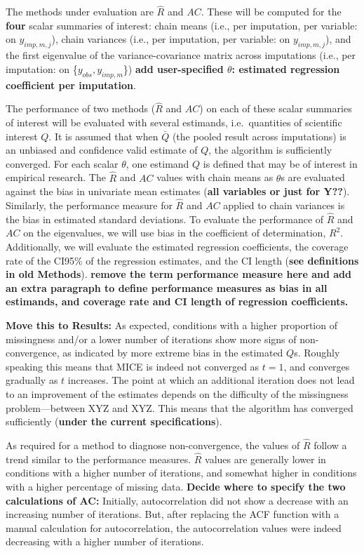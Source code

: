 \documentclass[Royal,times,sageh]{sagej}
\begin{document}
The methods under evaluation are \(\widehat{R}\) and \(AC\). These will
be computed for the \textbf{four} scalar summaries of interest: chain
means (i.e., per imputation, per variable: on \(y_{imp, m, j}\)), chain
variances (i.e., per imputation, per variable: on \(y_{imp, m, j}\)),
and the first eigenvalue of the variance-covariance matrix across
imputations (i.e., per imputation: on \{\(y_{obs}, y_{imp, m}\)\})
\textbf{add user-specified \(\theta\): estimated regression coefficient
per imputation}.

The performance of two methods (\(\widehat{R}\) and \(AC\)) on each of
these scalar summaries of interest will be evaluated with several
estimands, i.e.~quantities of scientific interest \(Q\). It is assumed
that when \(\bar{Q}\) (the pooled result across imputations) is an
unbiased and confidence valid estimate of \(Q\), the algorithm is
sufficiently converged. For each scalar \(\theta\), one estimand \(Q\)
is defined that may be of interest in empirical research. The
\(\widehat{R}\) and \(AC\) values with chain means as \(\theta\)s are
evaluated against the bias in univariate mean estimates (\textbf{all
variables or just for Y??}). Similarly, the performance measure for
\(\widehat{R}\) and \(AC\) applied to chain variances is the bias in
estimated standard deviations. To evaluate the performance of
\(\widehat{R}\) and \(AC\) on the eigenvalues, we will use bias in the
coefficient of determination, \(R^2\). Additionally, we will evaluate
the estimated regression coefficients, the coverage rate of the CI95\%
of the regression estimates, and the CI length (\textbf{see definitions
in old Methods}). \textbf{remove the term performance measure here and
add an extra paragraph to define performance measures as bias in all
estimands, and coverage rate and CI length of regression coefficients.}

\textbf{Move this to Results:} As expected, conditions with a higher
proportion of missingness and/or a lower number of iterations show more
signs of non-convergence, as indicated by more extreme bias in the
estimated \(Q\)s. Roughly speaking this means that MICE is indeed not
converged as \(t=1\), and converges gradually as \(t\) increases. The
point at which an additional iteration does not lead to an improvement
of the estimates depends on the difficulty of the missingness
problem---between XYZ and XYZ. This means that the algorithm has
converged sufficiently (\textbf{under the current specifications}).

As required for a method to diagnose non-convergence, the values of
\(\widehat{R}\) follow a trend similar to the performance measures.
\(\widehat{R}\) values are generally lower in conditions with a higher
number of iterations, and somewhat higher in conditions with a higher
percentage of missing data. \textbf{Decide where to specify the two
calculations of AC:} Initially, autocorrelation did not show a decrease
with an increasing number of iterations. But, after replacing the ACF
function with a manual calculation for autocorrelation, the
autocorrelation values were indeed decreasing with a higher number of
iterations.
\end{document}
